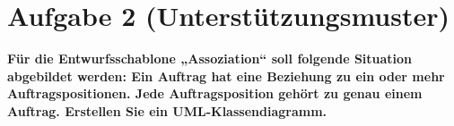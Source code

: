 \section{Aufgabe 2 (Unterstützungsmuster)}
\textbf{Für die Entwurfsschablone „Assoziation“ soll folgende Situation abgebildet werden: Ein
Auftrag hat eine Beziehung zu ein oder mehr Auftragspositionen. Jede Auftragsposition
gehört zu genau einem Auftrag. Erstellen Sie ein UML-Klassendiagramm.}

\clearpage

